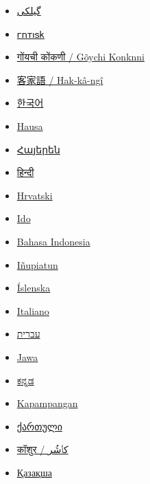 \documentclass[11pt,a4paper]{article}
\begin{document}
\begin{itemize}
\item \href{https://glk.wikipedia.org/wiki/\%D8\%A8\%D9\%8A\%D9\%84\%D9\%8A}{گیلکی}
\item \href{https://got.wikipedia.org/wiki/\%F0\%90\%8C\%B0\%F0\%90\%8C\%BD\%F0\%90\%8C\%B0\%F0\%90\%8C\%B8\%F0\%90\%8D\%83}{𐌲𐌿𐍄𐌹𐍃𐌺}
\item \href{https://gom.wikipedia.org/wiki/\%E0\%A4\%AC\%E0\%A4\%A6\%E0\%A4\%95}{गोंयची कोंकणी / Gõychi Konknni}
\item \href{https://hak.wikipedia.org/wiki/Ap-\%C3\%A8}{客家語 / Hak-kâ-ngî}
\item \href{https://ko.wikipedia.org/wiki/\%EC\%98\%A4\%EB\%A6\%AC}{한국어}
\item \href{https://ha.wikipedia.org/wiki/Agwagwa}{Hausa}
\item \href{https://hy.wikipedia.org/wiki/\%D4\%B2\%D5\%A1\%D5\%A4\%D5\%A5\%D6\%80}{Հայերեն}
\item \href{https://hi.wikipedia.org/wiki/\%E0\%A4\%AC\%E0\%A4\%A4\%E0\%A5\%8D\%E0\%A4\%A4\%E0\%A4\%96}{हिन्दी}
\item \href{https://hr.wikipedia.org/wiki/Patka}{Hrvatski}
\item \href{https://io.wikipedia.org/wiki/Anado}{Ido}
\item \href{https://id.wikipedia.org/wiki/Itik}{Bahasa Indonesia}
\item \href{https://ik.wikipedia.org/wiki/Mitiq}{Iñupiatun}
\item \href{https://is.wikipedia.org/wiki/\%C3\%96nd}{Íslenska}
\item \href{https://it.wikipedia.org/wiki/Anatra}{Italiano}
\item \href{https://he.wikipedia.org/wiki/\%D7\%91\%D7\%A8\%D7\%95\%D7\%95\%D7\%96}{עברית}
\item \href{https://jv.wikipedia.org/wiki/B\%C3\%A8b\%C3\%A8k}{Jawa}
\item \href{https://kn.wikipedia.org/wiki/\%E0\%B2\%AC\%E0\%B2\%BE\%E0\%B2\%A4\%E0\%B3\%81\%E0\%B2\%95\%E0\%B3\%8B\%E0\%B2\%B3\%E0\%B2\%BF}{ಕನ್ನಡ}
\item \href{https://pam.wikipedia.org/wiki/Bibi}{Kapampangan}
\item \href{https://ka.wikipedia.org/wiki/\%E1\%83\%98\%E1\%83\%AE\%E1\%83\%95\%E1\%83\%94\%E1\%83\%91\%E1\%83\%98}{ქართული}
\item \href{https://ks.wikipedia.org/wiki/\%D8\%A8\%D9\%8E\%D8\%B7\%D9\%8F\%D8\%AE}{कॉशुर / کٲشُر}
\item \href{https://kk.wikipedia.org/wiki/\%D2\%AE\%D0\%B9\%D1\%80\%D0\%B5\%D0\%BA}{Қазақша}

\end{itemize}
\end{document}
